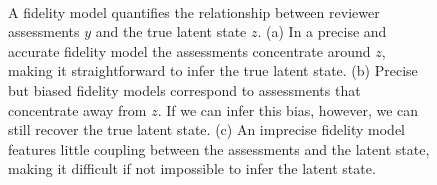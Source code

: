 \documentclass[
  letterpaper,
  DIV=11,
  numbers=noendperiod]{scrartcl}
\begin{document}
\begin{figure}
\begin{minipage}[t]{0.30\linewidth}
{{}

}

\subcaption{\label{fig-precise-biased}}
\end{minipage}%
%
\begin{minipage}[t]{0.30\linewidth}

{\centering 


}

\subcaption{\label{fig-imprecise}}
\end{minipage}%
%
\begin{minipage}[t]{0.05\linewidth}

{\centering 

~

}

\end{minipage}%

\caption{\label{fig-fidelity}A fidelity model quantifies the
relationship between reviewer assessments \(y\) and the true latent
state \(z\). (a) In a precise and accurate fidelity model the
assessments concentrate around \(z\), making it straightforward to infer
the true latent state. (b) Precise but biased fidelity models correspond
to assessments that concentrate away from \(z\). If we can infer this
bias, however, we can still recover the true latent state. (c) An
imprecise fidelity model features little coupling between the
assessments and the latent state, making it difficult if not impossible
to infer the latent state.}

\end{figure}
\end{document}
